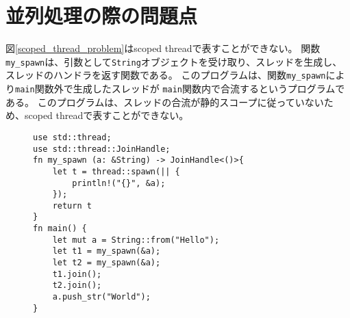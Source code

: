 \documentclass{sumiilab-paper}
\theoremstyle{mystyle}
\numberwithin{definition}{chapter} %
\begin{document}
\section{並列処理の際の問題点}
図\ref{scoped_thread_problem}はscoped threadで表すことができない。
関数\texttt{my\_spawn}は、引数として\texttt{String}オブジェクトを受け取り、スレッドを生成し、
スレッドのハンドラを返す関数である。
このプログラムは、関数\texttt{my\_spawn}により\texttt{main}関数外で生成したスレッドが
\texttt{main}関数内で合流するというプログラムである。
このプログラムは、スレッドの合流が静的スコープに従っていないため、scoped threadで表すことができない。
\begin{figure}[htp]
\begin{lstlisting}[caption=scoped threadで表せない例, 
  label=scoped_thread_problem, captionpos=b]
use std::thread;
use std::thread::JoinHandle;
fn my_spawn (a: &String) -> JoinHandle<()>{
    let t = thread::spawn(|| {
        println!("{}", &a);
    });
    return t
}
fn main() {
    let mut a = String::from("Hello");
    let t1 = my_spawn(&a);
    let t2 = my_spawn(&a);
    t1.join();
    t2.join();
    a.push_str("World");
}
\end{lstlisting}
\end{figure}
\end{document}
